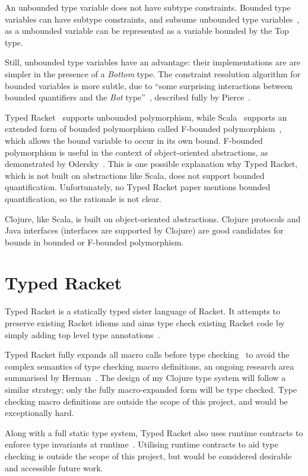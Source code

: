 An unbounded type variable does not have subtype constraints.
Bounded type variables can have subtype constraints, and 
subsume unbounded type variables~\cite{PT00}, 
as a unbounded variable can be represented as a variable bounded
by the Top type.

Still, unbounded type variables have an advantage: their implementations are
are simpler in the presence of a \emph{Bottom} type. 
The constraint resolution algorithm for bounded variables
is more subtle, due to ``some surprising interactions between bounded quantifiers
and the \emph{Bot} type''~\cite{PT00}, described fully
by Pierce~\cite{Pie97}.

Typed Racket~\cite{TF08}
supports unbounded polymorphism, while Scala~\cite{OCD+}
supports an extended form of bounded polymorphism called
F-bounded polymorphism~\cite{CCHOM89}, which allows the
bound variable to occur in its own bound.
F-bounded polymorphism is useful in the context of object-oriented abstractions,
as demonstrated by Odersky~\cite{OCD+}.
This is one possible explanation why Typed Racket, which is not built on abstractions like Scala,
does not support bounded quantification. Unfortunately, no Typed Racket paper mentions 
bounded quantification, so the rationale is not clear.

Clojure, like Scala, is built on object-oriented abstractions. Clojure protocols
and Java interfaces (interfaces are supported by Clojure) are good candidates
for bounds in bounded or F-bounded polymorphism.

\section{Typed Racket}

Typed Racket is a statically typed sister language of Racket. It
attempts to preserve existing Racket idioms and aims type check
existing Racket code by simply adding top level type annotations~\cite{Tob10}.

Typed Racket fully expands all macro calls before type checking~\cite{Tob10} to
avoid the complex semantics of type checking macro definitions, an ongoing research area summarised
 by Herman~\cite{Her10}.
The design of my Clojure type system will follow a similar strategy; only the fully macro-expanded form
will be type checked. Type checking macro definitions are outside the scope of this project, and would
be exceptionally hard.

Along with a full static type system, Typed Racket 
also uses runtime contracts to enforce type invariants at runtime~\cite{TF08}.
Utilising runtime contracts to aid type checking is outside the scope of this project, but would be 
considered desirable and accessible future work.

